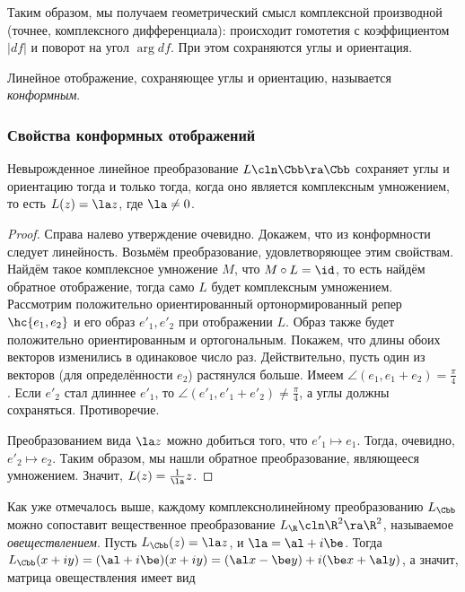 \documentclass[a4paper]{article}
\begin{document}
Таким образом, мы получаем геометрический смысл комплексной производной (точнее, комплексного дифференциала):
происходит гомотетия с коэффициентом $|df|$ и поворот на угол $\arg df$. При этом сохраняются углы и ориентация.

\begin{df}
Линейное отображение, сохраняющее углы и ориентацию, называется \emph{конформным}.
\end{df}

\subsubsection{Свойства конформных отображений}
\label{ConformMappings}
\begin{prop}
Невырожденное линейное преобразование $L\cln \Cbb\ra\Cbb$ сохраняет углы и ориентацию
тогда и только тогда, когда оно является комплексным умножением, то есть
$L(z) = \la z$, где $\la \neq 0$.
\end{prop}
\begin{proof}
Справа налево утверждение очевидно. Докажем, что из конформности следует линейность.
Возьмём преобразование, удовлетворяющее этим свойствам. Найдём такое комплексное умножение
$M$, что $M \circ L = \id$, то есть найдём обратное отображение, тогда само $L$ будет комплексным умножением.
Рассмотрим положительно ориентированный ортонормированный репер
$\hc{e_1, e_2}$ и его образ ${e'_1, e'_2}$ при отображении $L$. Образ также будет положительно
ориентированным и ортогональным. Покажем, что длины обоих векторов изменились в одинаковое число раз.
Действительно, пусть один из векторов (для определённости $e_2$) растянулся больше.
Имеем $\angle (e_1, e_1+e_2) = \frac{\pi}{4}$. Если $e'_2$ стал
длиннее $e'_1$, то $\angle(e'_1,e'_1+e'_2) \neq \frac{\pi}{4}$, а углы должны сохраняться. Противоречие.

Преобразованием вида $\la z$ можно добиться того, что $e'_1 \mapsto e_1$. Тогда, очевидно, $e'_2 \mapsto e_2$.
Таким образом, мы нашли обратное преобразование, являющееся умножением. Значит, $L(z) = \frac{1}{\la}z$.
\end{proof}

Как уже отмечалось выше, каждому комплексно\д линейному преобразованию $L_\Cbb$ можно сопоставит вещественное
преобразование $L_\R\cln\R^2\ra\R^2$, называемое \emph{овеществлением}. Пусть $L_\Cbb(z) = \la z$, и $\la = \al+i\be$.
Тогда $L_\Cbb(x+iy) = (\al+i\be)(x+iy)=(\al x-\be y)+i(\be x+\al y)$, а значит, матрица овеществления имеет вид
\end{document}
